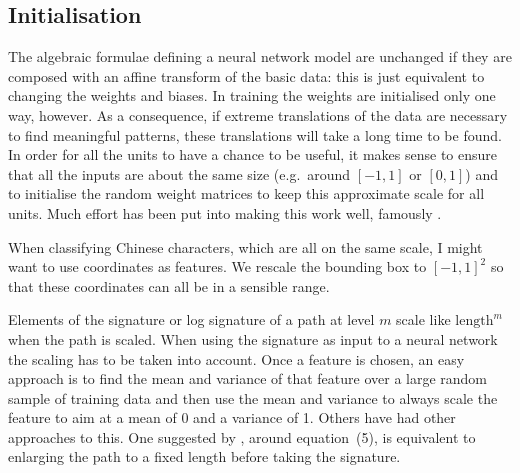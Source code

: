\subsection{Initialisation}
\label{sec:initialisation}
The algebraic formulae defining a neural network model are unchanged if they are composed with an affine transform of the basic data: this is just equivalent to changing the weights and biases.
In training the weights are initialised only one way, however.
As a consequence, if extreme translations of the data are necessary to find meaningful patterns, these translations will take a long time to be found.
In order for all the units to have a chance to be useful, it makes sense to ensure that all the inputs are about the same size (e.g.~around $[-1,1]$ or $[0,1]$) and to initialise the random weight matrices to keep this approximate scale for all units.
Much effort has been put into making this work well, famously \cite{Glorot,He,init}.

When classifying Chinese characters, which are all on the same scale, I might want to use coordinates as features.
We rescale the bounding box to $[-1,1]^2$ so that these coordinates can all be in a sensible range.

Elements of the signature or log signature of a path at level $m$ scale like $\mathrm{length}^m$ when the path is scaled.
When using the signature as input to a neural network the scaling has to be taken into account.
Once a feature is chosen, an easy approach is to find the mean and variance of that feature over a large random sample of training data and then use the mean and variance to always scale the feature to aim at a mean of 0 and a variance of 1.
Others have had other approaches to this.
One suggested by \cite{LengthNormalized}, around equation~(5), is equivalent to enlarging the path to a fixed length before taking the signature.

